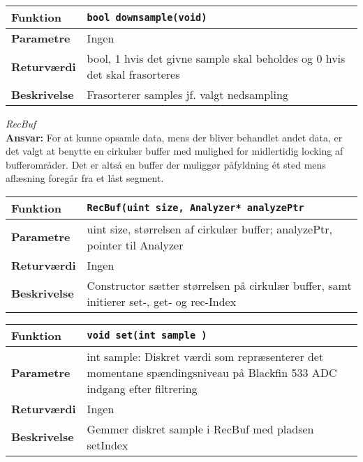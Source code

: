 \begin{center}
    \begin{tabular}{ | l | p{} |}
    \hline
    \textbf{Funktion}	& \verb+bool downsample(void) +						\\ \hline
    \textbf{Parametre} 	& Ingen		\\ \hline
    \textbf{Returværdi}	&  bool, 1 hvis det givne sample skal beholdes og 0 hvis det skal frasorteres 								\\ \hline
    \textbf{Beskrivelse}& Frasorterer samples jf. valgt nedsampling		\\ \hline
    \end{tabular}
\end{center}


\textit{RecBuf} \\
\textbf{Ansvar:} For at kunne opsamle data, mens der bliver behandlet andet data, er det valgt at benytte en cirkulær buffer med mulighed for midlertidig locking af bufferområder. Det er altså en buffer der muliggør påfyldning ét sted mens aflæsning foregår fra et låst segment.

\begin{center}
    \begin{tabular}{ | l | p{} |}
    \hline
    \textbf{Funktion}	& \verb+RecBuf(uint size, Analyzer* analyzePtr +						\\ \hline
    \textbf{Parametre} 	& uint size, størrelsen af cirkulær buffer; analyzePtr, pointer til Analyzer		\\ \hline
    \textbf{Returværdi}	& Ingen 								\\ \hline
    \textbf{Beskrivelse}& Constructor sætter størrelsen på cirkulær buffer, samt initierer set-, get- og rec-Index 		\\ \hline
    \end{tabular}
\end{center} 

\begin{center}
    \begin{tabular}{ | l | p{} |}
    \hline
    \textbf{Funktion}	& \verb+void set(int sample ) +						\\ \hline
    \textbf{Parametre} 	& int sample: Diskret værdi som repræsenterer det momentane spændingsniveau på Blackfin 533 ADC indgang	efter filtrering	\\ \hline
    \textbf{Returværdi}	& Ingen 								\\ \hline
    \textbf{Beskrivelse}& Gemmer diskret sample i RecBuf med pladsen setIndex		\\ \hline
    \end{tabular}
\end{center} 

